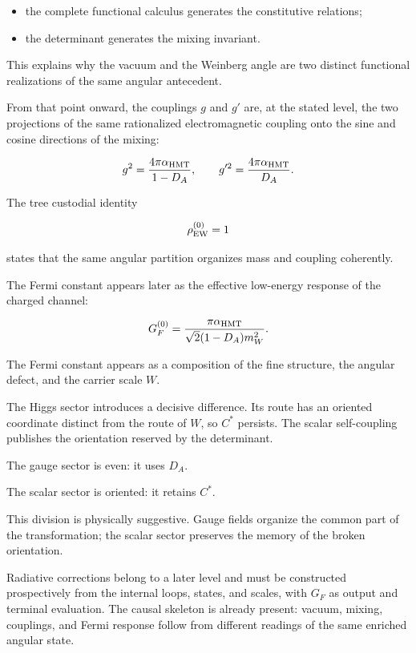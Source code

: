 \begin{itemize}[leftmargin=*,itemsep=0.35em]
\item the complete functional calculus generates the constitutive relations;
\item the determinant generates the mixing invariant.
\end{itemize}

This explains why the vacuum and the Weinberg angle are two distinct functional realizations of the same angular antecedent.\par

From that point onward, the couplings \(g\) and \(g'\) are, at the stated level, the two projections of the same rationalized electromagnetic coupling onto the sine and cosine directions of the mixing:\par

\[
g^2
=
\frac{4\pi\alpha_{\rm HMT}}{1-D_A},
\qquad
g'^2
=
\frac{4\pi\alpha_{\rm HMT}}{D_A}.
\]

The tree custodial identity\par

\[
\rho_{\rm EW}^{(0)}=1
\]

states that the same angular partition organizes mass and coupling coherently.\par

The Fermi constant appears later as the effective low-energy response of the charged channel:\par

\[
G_F^{(0)}
=
\frac{\pi\alpha_{\rm HMT}}
{\sqrt2(1-D_A)m_W^2}.
\]

The Fermi constant appears as a composition of the fine structure, the angular defect, and the carrier scale \(W\).\par

The Higgs sector introduces a decisive difference. Its route has an oriented coordinate distinct from the route of \(W\), so \(C^*\) persists. The scalar self-coupling publishes the orientation reserved by the determinant.\par

The gauge sector is even: it uses \(D_A\).\par
The scalar sector is oriented: it retains \(C^*\).\par

This division is physically suggestive. Gauge fields organize the common part of the transformation; the scalar sector preserves the memory of the broken orientation.\par

Radiative corrections belong to a later level and must be constructed prospectively from the internal loops, states, and scales, with \(G_F\) as output and terminal evaluation. The causal skeleton is already present: vacuum, mixing, couplings, and Fermi response follow from different readings of the same enriched angular state.\par


